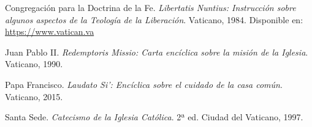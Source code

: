 \documentclass[12pt]{article}
\begin{document}
\begin{thebibliography}{9}

Congregación para la Doctrina de la Fe. 
\textit{Libertatis Nuntius: Instrucción sobre algunos aspectos de la Teología de la Liberación}. 
Vaticano, 1984. Disponible en: \url{https://www.vatican.va}

Juan Pablo II. 
\textit{Redemptoris Missio: Carta encíclica sobre la misión de la Iglesia}. 
Vaticano, 1990.

Papa Francisco. 
\textit{Laudato Si’: Encíclica sobre el cuidado de la casa común}. 
Vaticano, 2015.

Santa Sede. 
\textit{Catecismo de la Iglesia Católica}. 2ª ed. 
Ciudad del Vaticano, 1997.

\end{thebibliography}
\end{document}

